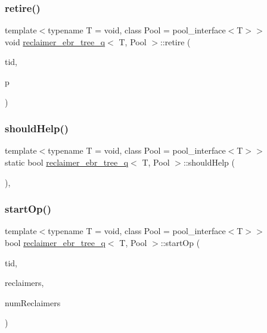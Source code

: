 \subsubsection{\texorpdfstring{retire()}{retire()}}
{\footnotesize\ttfamily template$<$typename T  = void, class Pool  = pool\+\_\+interface$<$\+T$>$$>$ \\
void \hyperlink{classreclaimer__ebr__tree__q}{reclaimer\+\_\+ebr\+\_\+tree\+\_\+q}$<$ T, Pool $>$\+::retire (\begin{DoxyParamCaption}\item[{const int}]{tid,  }\item[{T $\ast$}]{p }\end{DoxyParamCaption})\hspace{0.3cm}{\ttfamily [inline]}}

\mbox{\label{classreclaimer__ebr__tree__q_a50c8fbcc4b2d66491e1cbb449c61f863}} 
\subsubsection{\texorpdfstring{should\+Help()}{shouldHelp()}}
{\footnotesize\ttfamily template$<$typename T  = void, class Pool  = pool\+\_\+interface$<$\+T$>$$>$ \\
static bool \hyperlink{classreclaimer__ebr__tree__q}{reclaimer\+\_\+ebr\+\_\+tree\+\_\+q}$<$ T, Pool $>$\+::should\+Help (\begin{DoxyParamCaption}{ }\end{DoxyParamCaption})\hspace{0.3cm}{\ttfamily [inline]}, {\ttfamily [static]}}

\mbox{\label{classreclaimer__ebr__tree__q_a87abaab7960fab864deaff4e6f358996}} 
\subsubsection{\texorpdfstring{start\+Op()}{startOp()}}
{\footnotesize\ttfamily template$<$typename T  = void, class Pool  = pool\+\_\+interface$<$\+T$>$$>$ \\
bool \hyperlink{classreclaimer__ebr__tree__q}{reclaimer\+\_\+ebr\+\_\+tree\+\_\+q}$<$ T, Pool $>$\+::start\+Op (\begin{DoxyParamCaption}\item[{const int}]{tid,  }\item[{void $\ast$const $\ast$const}]{reclaimers,  }\item[{const int}]{num\+Reclaimers }\end{DoxyParamCaption})\hspace{0.3cm}{\ttfamily [inline]}}

